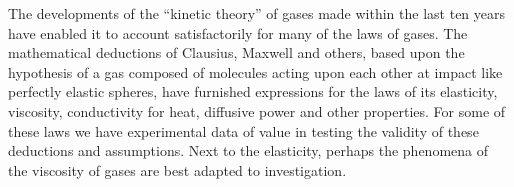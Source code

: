 %
%

The developments of the ``kinetic theory'' of gases made within the last ten years have enabled it to account satisfactorily for many of the laws of gases. The mathematical deductions of Clausius, Maxwell and others, based upon the hypothesis of a gas composed of molecules acting upon each other at impact like perfectly elastic spheres, have furnished expressions for the laws of its elasticity, viscosity, conductivity for heat, diffusive power and other properties. For some of these laws we have experimental data of value in testing the validity of these deductions and assumptions. Next to the elasticity, perhaps the phenomena of the viscosity of gases are best adapted to investigation.

